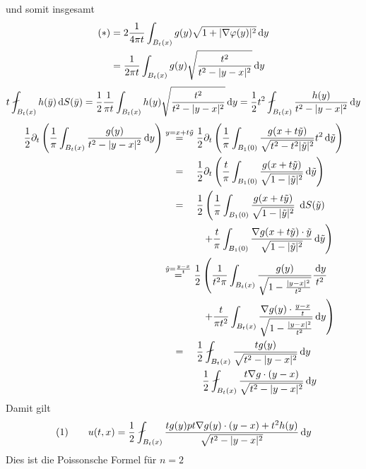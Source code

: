 \begin{bemerkung}
\begin{enumerate}[(i)]
\[		\]
		und somit insgesamt
		\begin{align*}
			(*) &= 2 \frac{1}{4 \pi t} \int_{B_t(x)}^{} g(y) \sqrt{1+ \lvert \nabla \varphi(y)\rvert^2} \,\mathrm{d}y \\
			&= \frac{1}{2 \pi t} \int_{B_t(x)}^{} g(y) \sqrt{\frac{t^2}{t^2-\lvert y-x\rvert^2}} \,\mathrm{d}y 
		\end{align*}
		\[
			t \fint_{B_t(x)}^{} h( \bar{y}) \,\mathrm{d}S(\bar{y}) 
			= \frac{1}{2} \frac{1}{\pi t} \int_{B_t(x)}^{} h(y) \sqrt{\frac{t^2}{t^2 - \abs{y-x}^2}} \,\mathrm{d}y 
			= \frac{1}{2} t^2 \fint_{B_t(x)}^{} \frac{h(y)}{t^2-\abs{y-x}^2} \,\mathrm{d}y
		\]
		\begin{align*}
			\frac{1}{2} \partial_t \left( \frac{1}{\pi} \int_{B_t(x)}^{} \frac{g(y)}{t^2-\abs{y-x}^2} \,\mathrm{d}y \right) & \stackrel{y = x + t \tilde y}{=} 
			\frac{1}{2} \partial_t \left( \frac{1}{\pi} \int_{B_1(0)}^{} \frac{g(x + t \tilde y)}{\sqrt{t^2 - t^2 \abs{\tilde y}^2}}t^2 \,\mathrm{d} \tilde y \right) \\
			& \stackrel{\hphantom{y = x + t \tilde y}}{=} 
			\frac{1}{2} \partial_t \left(  \frac{t}{ \pi} \int_{B_1(0)}^{} \frac{g(x+ t \tilde y)}{\sqrt{1- \abs{ \tilde y}^2}} \,\mathrm{d} \tilde y \right) \\
			& \stackrel{\hphantom{y = x + t \tilde y}}{=} \frac{1}{2} \left( \frac{1}{\pi} \int_{B_1(0)}^{} \frac{g(x+ t \tilde y)}{\sqrt{1 - \abs{ \tilde y}^2}} 
			\right. \,\mathrm{d}S( \tilde y) \\ & \qquad \qquad  \left .
		+ \frac{t}{\pi} \int_{B_1(0)}^{} \frac{ \nabla  g(x+ t \tilde y) \cdot \tilde y}{\sqrt{1- \abs{ \tilde y}^2}} \,\mathrm{d} \tilde y \right) \\
			 & \stackrel{\hat{y}= \frac{y-x}{t}}{=} \frac{1}{2} \left( \frac{1}{t^2 \pi} \int_{B_t(x)}^{} \frac{g(y)}{ \sqrt{1- \frac{\abs{y-x}^2}{t^2}}}
		 \frac{\,\mathrm{d}y}{t^2} \right. \hphantom{)} \\ & \qquad \qquad  \left. + \frac{t}{\pi t^2} \int_{B_t(x)}^{} \frac{ \nabla g(y) \cdot \frac{y-x}{t}}{\sqrt{1-\frac{\abs{y-x}^2}{t^2}}} 
			 \,\mathrm{d}y \right) \\
			 & \stackrel{\hphantom{y = x + t \tilde y}}{=} \frac{1}{2} \fint_{B_t(x)}^{} \frac{t g(y)}{ \sqrt{t^2 - \abs{y-x}^2}} \,\mathrm{d}y \\
			 & \qquad \qquad \frac{1}{2} \fint_{B_t(x)}^{} \frac{t  \nabla g \cdot (y-x)}{\sqrt{t^2 - \abs{y-x}^2}} \,\mathrm{d}y
		\end{align*}
		Damit gilt
		\[
			(1)\qquad u(t,x)= \frac{1}{2} \fint_{B_t(x)}^{} \frac{t g(y) p t  \nabla g(y) \cdot (y-x) + t^2 h(y)}{\sqrt{t^2 - \abs{y-x}^2}} \,\mathrm{d}y
		\]
		Dies ist die Poissonsche Formel für $n=2$
	\end{enumerate}
\end{bemerkung}

